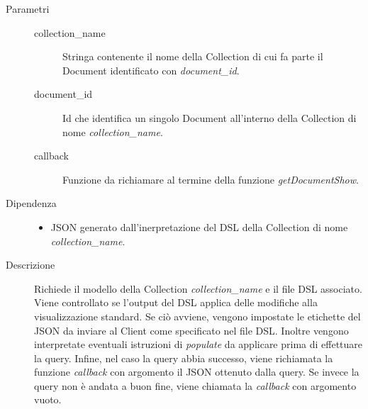 \begin{description}
\begin{mldescription}
	 \hfill
		\begin{description}
			\item[Parametri] \hfill
				\begin{description}
					\item[collection\_name] \hfill
						Stringa contenente il nome della Collection di cui fa parte il Document identificato 							con \textit{document\_id}.
					\item[document\_id] \hfill
						Id che identifica un singolo Document all'interno della Collection di nome 									\textit{collection\_name}.
					\item[callback] \hfill
						Funzione da richiamare al termine della funzione \textit{getDocumentShow}.
				\end{description}
			\item[Dipendenza] \hfill
				\begin{itemize}
					\item JSON generato dall'inerpretazione del DSL della Collection di nome 										\textit{collection\_name}.
				\end{itemize}
			\item[Descrizione] \hfill
			Richiede il modello della Collection \textit{collection\_name} e il file DSL associato. Viene controllato se l'output del DSL applica delle modifiche alla visualizzazione standard. Se ciò avviene, vengono impostate le etichette del JSON da inviare al Client come specificato nel file DSL. Inoltre vengono interpretate eventuali istruzioni di \textit{populate} da applicare prima di effettuare la query. Infine, nel caso la query abbia successo, viene richiamata la funzione \textit{callback} con argomento il JSON ottenuto dalla query. Se invece la query non è andata a buon fine, viene chiamata la \textit{callback} con argomento vuoto.
		\end{description}
	

\end{mldescription}
\end{description}
